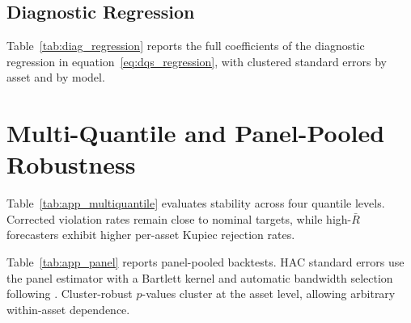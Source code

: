 \documentclass[preprint,11pt,authoryear]{elsarticle}
\newcommand{\1}{\boldsymbol{1}}
\begin{document}
\subsection{Diagnostic Regression}
\label{app:diag_regression}

Table~\ref{tab:diag_regression} reports the full coefficients of the
diagnostic regression in equation~\eqref{eq:dqs_regression}, with
clustered standard errors by asset and by model.

\begin{table}[H]
	\centering
	\caption{Diagnostic regression of Quantile Score improvement
	$\Delta\mathrm{QS}=\mathrm{QS}^{\mathrm{raw}}-\mathrm{QS}^{\mathrm{cp}}$
	on the conformal threshold and the raw violation rate
	(equation~\eqref{eq:dqs_regression}), $n = 312$ model--asset pairs.
	Standard errors in parentheses; clustering by asset and by
	model reported separately. Significance: $^{*}$~10\%,
	$^{**}$~5\%, $^{***}$~1\%.}
	\label{tab:diag_regression}
	\footnotesize
	
\end{table}


\section{Multi-Quantile and Panel-Pooled Robustness}
\label{app:panel_robustness}

Table~\ref{tab:app_multiquantile} evaluates stability across four quantile
levels. Corrected violation rates remain close to nominal targets, while
high-$\bar R$ forecasters exhibit higher per-asset Kupiec rejection rates.

\begin{table}[H]
	\centering
	\caption{Multi-quantile evaluation for TSFMs (mean across 24 assets).
		Corrected $\hat\pi$ and Kupiec rejection count at four quantile levels.}
	\label{tab:app_multiquantile}
	\footnotesize
	
\end{table}

Table~\ref{tab:app_panel} reports panel-pooled backtests. HAC standard errors
use the \citet{driscoll1998consistent} panel estimator with a Bartlett kernel
and automatic bandwidth selection following \citet{newey1994automatic}.
Cluster-robust $p$-values cluster at the asset level, allowing arbitrary
within-asset dependence.

\begin{table}[H]
	\centering
	\caption{Panel-pooled backtest ($\alpha=0.01$). TSFMs and classical
		benchmarks differ in $N_{\mathrm{panel}}$ because of different warm-up
		requirements (512 vs.\ 250 observations).}
	\label{tab:app_panel}
	\footnotesize
	
\end{table}
\end{document}
